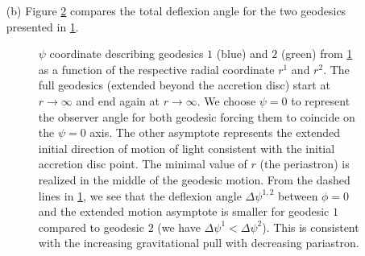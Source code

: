 \documentclass[10pt, a4paper]{article}
\begin{document}
{\begin{enumerate}
\begin{figure}[h!]
    \caption{Equatorial plane sketch of geodesic motion with three different impact parameters and periastra \label{fig1}. The periastra gets further away from the accretion disk point as we get closer to the outer ring of the accretion disk. If the disk was large, the geodesic starting on the outer ring would approximatively be a straight line starting at the disk point and directed towards the observer. In this limit, the periastron is located exactly in the middle of the line.}
  \end{figure}
\newpage
  \item[(b)] Figure \ref{fig2} compares the total deflexion angle for the two geodesics presented in \ref{fig1}.
  \begin{figure}[h!]
    \centering
    \caption{$\psi$ coordinate describing geodesics $1$ (blue) and $2$ (green) from \ref{fig1} as a function of the respective radial coordinate $r^1$ and $r^2$. The full geodesics (extended beyond the accretion disc) start at $r \to \infty$ and end again at $r\to \infty$. We choose $\psi = 0$ to represent the observer angle for both geodesic forcing them to coincide on the $\psi = 0$ axis. The other asymptote represents the extended initial direction of motion of light consistent with the initial accretion disc point. The minimal value of $r$ (the periastron) is realized in the middle of the geodesic motion. From the dashed lines in \ref{fig1}, we see that the deflexion angle $\Delta \psi^{1, 2}$ between $\phi = 0$ and the extended motion asymptote is smaller for geodesic $1$ compared to geodesic $2$ (we have $\Delta \psi^{1} < \Delta \psi^{2}$)\label{fig2}. This is consistent with the increasing gravitational pull with decreasing pariastron.}

\end{figure}
\end{enumerate}}
\end{document}
